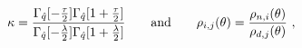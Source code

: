 \begin{equation}
\kappa =\frac{\Gamma _{\hat{q}}[-\frac{\tau }{2}]\Gamma _{\hat{q}}[1+\frac{%
\tau }{2}]}{\Gamma _{\hat{q}}[-\frac{\lambda }{2}]\Gamma _{\hat{q}}[1+\frac{%
\lambda }{2}]}\quad \quad \text{and\quad \quad }\rho _{i,j}(\theta )=\frac{%
\rho _{n,i}(\theta )}{\rho _{d,j}(\theta )}~,
\end{equation}%
